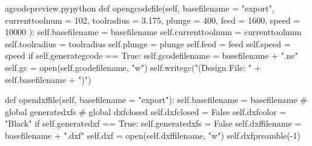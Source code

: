 \documentclass{ltxdoc}
\begin{document}
\lstset{firstnumber=\thegcpy}
\begin{writecode}{a}{gcodepreview.py}{python}
    def opengcodefile(self, basefilename = "export", 
                      currenttoolnum = 102, 
                      toolradius = 3.175, 
                      plunge = 400, 
                      feed = 1600, 
                      speed = 10000
                      ):
        self.basefilename = basefilename
        self.currenttoolnum = currenttoolnum
        self.toolradius = toolradius
        self.plunge = plunge
        self.feed = feed
        self.speed = speed
        if self.generategcode == True:
            self.gcodefilename = basefilename + ".nc"
            self.gc = open(self.gcodefilename, "w")
            self.writegc("(Design File: " + self.basefilename + ")")

    def opendxffile(self, basefilename = "export"): 
        self.basefilename = basefilename
#        global generatedxfs
#        global dxfclosed
        self.dxfclosed = False
        self.dxfcolor = "Black"
        if self.generatedxf == True:
            self.generatedxfs = False
            self.dxffilename = basefilename + ".dxf"
            self.dxf = open(self.dxffilename, "w")
            self.dxfpreamble(-1)


\end{writecode}
\end{document}
